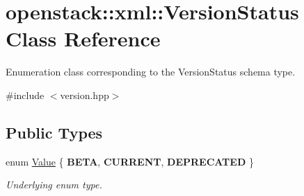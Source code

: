 \hypertarget{classopenstack_1_1xml_1_1VersionStatus}{
\section{openstack::xml::VersionStatus Class Reference}
\label{classopenstack_1_1xml_1_1VersionStatus}
}


Enumeration class corresponding to the VersionStatus schema type.  




{\ttfamily \#include $<$version.hpp$>$}

\subsection*{Public Types}
\begin{DoxyCompactItemize}
\item 
enum \hyperlink{classopenstack_1_1xml_1_1VersionStatus_a349f60055c2660ef73373729319b10f5}{Value} \{ {\bfseries BETA}, 
{\bfseries CURRENT}, 
{\bfseries DEPRECATED}
 \}
\begin{DoxyCompactList}\small\item\em Underlying enum type. \item\end{DoxyCompactList}\end{DoxyCompactItemize}
